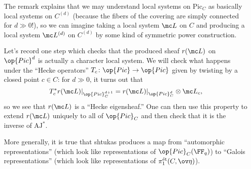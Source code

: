 \documentclass[../notes.tex]{subfiles}
\begin{document}
The remark explains that we may understand local systems on $\mathrm{Pic}_C$ as basically local systems on $C^{(d)}$ (because the fibers of the covering are simply connected for $d\gg0$!), so we can imagine taking a local system $\mc L$ on $C$ and producing a local system $\mc L^{(d)}$ on $C^{(d)}$ by some kind of symmetric power construction.
\begin{remark}
	Let's record one step which checks that the produced sheaf $r(\mc L)$ on $\op{Pic}^d$ is actually a character local system. We will check what happens under the ``Hecke operators'' $T_c\colon\op{Pic}\to\op{Pic}$ given by twisting by a closed point $c\in C$: for $d\gg0$, it turns out that
	\[T_c^*r(\mc L)|_{\op{Pic}_C^{d+1}}=r(\mc L)|_{\op{Pic}_C^d}\otimes\mc L_c,\]
	so we see that $r(\mc L)$ is a ``Hecke eigensheaf.'' One can then use this property to extend $r(\mc L)$ uniquely to all of $\op{Pic}_C$ and then check that it is the inverse of $\mathrm{AJ}^*$.
\end{remark}
\begin{remark}
	More generally, it is true that shtukas produces a map from ``automorphic representations'' (which look like representations of $\op{Pic}_C(\FF_q)$) to ``Galois representations'' (which look like representations of $\pi_1^{\mathrm{\acute et}}(C,\ov\eta)$).
\end{remark}
\end{document}
